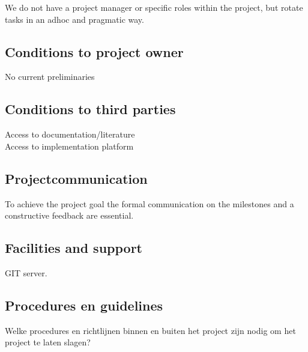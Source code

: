 \documentclass{article}
\begin{document}
We do not have a project manager or specific roles within the project, but rotate tasks in an adhoc and pragmatic way.

\subsection{Conditions to project owner}

No current preliminaries

\subsection{Conditions to third parties}

Access to documentation/literature\\
Access to implementation platform

\subsection{Projectcommunication}

To achieve the project goal the formal communication on the milestones and a constructive feedback are essential.

\subsection{Facilities and support}

GIT server.

\subsection{Procedures en guidelines}
Welke procedures en richtlijnen binnen en buiten het project zijn nodig om het project te laten slagen?
\end{document}
